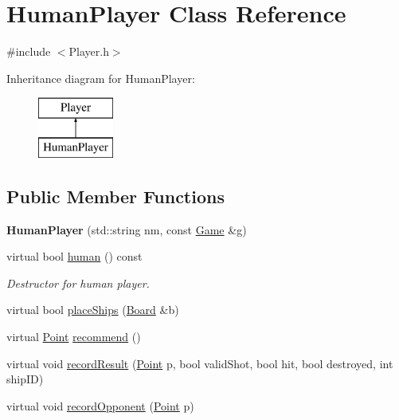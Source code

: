 \hypertarget{class_human_player}{}\section{Human\+Player Class Reference}
\label{class_human_player}


{\ttfamily \#include $<$Player.\+h$>$}

Inheritance diagram for Human\+Player\+:\begin{figure}[H]
\begin{center}
\leavevmode
\includegraphics[height=2.000000cm]{class_human_player}
\end{center}
\end{figure}
\subsection*{Public Member Functions}
\begin{DoxyCompactItemize}
\item 
\mbox{\label{class_human_player_a443ff25b201959966555c0902a10e19c}} 
{\bfseries Human\+Player} (std\+::string nm, const \mbox{\hyperlink{class_game}{Game}} \&g)
\item 
\mbox{\label{class_human_player_acecbe621447504a013c2a763aaba05fa}} 
virtual bool \mbox{\hyperlink{class_human_player_acecbe621447504a013c2a763aaba05fa}{human}} () const
\begin{DoxyCompactList}\small\item\em Destructor for human player. \end{DoxyCompactList}\item 
virtual bool \mbox{\hyperlink{class_human_player_ae9315a3c66f6b2f2bf4d1ebb09669aff}{place\+Ships}} (\mbox{\hyperlink{class_board}{Board}} \&b)
\item 
virtual \mbox{\hyperlink{class_point}{Point}} \mbox{\hyperlink{class_human_player_a718f16f3ddeeb34c9f2e93cf1d805b46}{recommend}} ()
\item 
virtual void \mbox{\hyperlink{class_human_player_a19be81244b7a1c88a3ca89d207055b6e}{record\+Result}} (\mbox{\hyperlink{class_point}{Point}} p, bool valid\+Shot, bool hit, bool destroyed, int ship\+ID)
\item 
virtual void \mbox{\hyperlink{class_human_player_a16b18f42e02d7c8d1f0971ce5e91595f}{record\+Opponent}} (\mbox{\hyperlink{class_point}{Point}} p)
\end{DoxyCompactItemize}


